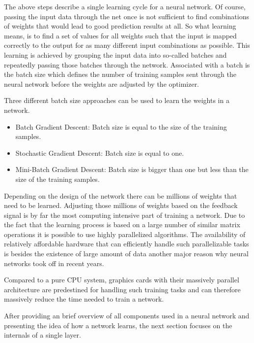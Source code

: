 The above steps describe a single learning cycle for a neural network. Of course, passing the input data through the net once is not sufficient to find combinations of weights that would lead to good prediction results at all. So what learning means, is to find a set of values for all weights such that the input is mapped correctly to the output for as many different input combinations as possible. This learning is achieved by grouping the input data into so-called batches and repeatedly passing those batches through the network. Associated with a batch is the batch size which defines the number of training samples sent through the neural network before the weights are adjusted by the optimizer.  
\begin{remark}
	Three different batch size approaches can be used to learn the weights in a network.
	\begin{itemize}
		\item Batch Gradient Descent: Batch size is equal to the size of the training samples.
		\item Stochastic Gradient Descent: Batch size is equal to one.
		\item Mini-Batch Gradient Descent: Batch size is bigger than one but less than the size of the training samples.
	\end{itemize} 
\end{remark}

Depending on the design of the network there can be millions of weights that need to be learned. Adjusting those millions of weights based on the feedback signal is by far the most computing intensive part of training a network. Due to the fact that the learning process is based on a large number of similar matrix operations it is possible to use highly parallelized algorithms. The availability of relatively affordable hardware that can efficiently handle such parallelizable tasks is besides the existence of large amount of data another  major reason why neural networks took off in recent years.  

\begin{remark}
	 Compared to a pure CPU system, graphics cards with their massively parallel architecture are predestined for handling such training tasks and can therefore massively reduce the time needed to train a network.
\end{remark}

After providing an brief overview of all components used in a neural network and presenting the idea of how a network learns, the next section focuses on the internals of a single layer.

